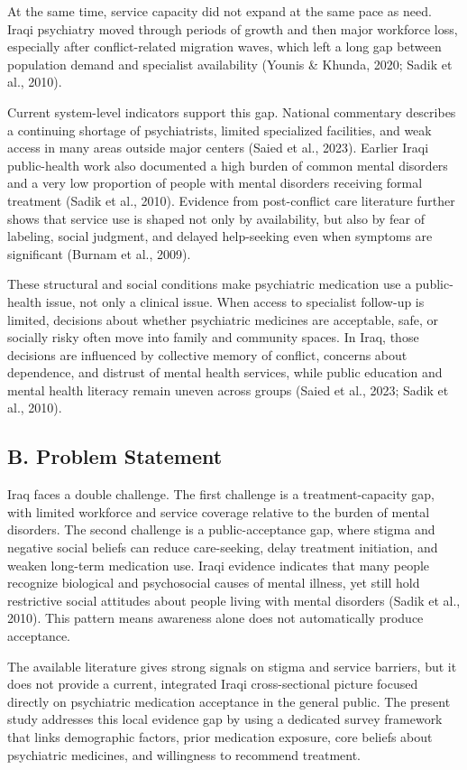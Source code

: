 \documentclass[12pt,a4paper]{article}
\begin{document}
At the same time, service capacity did not expand at the same pace as need. Iraqi psychiatry moved through periods of growth and then major workforce loss, especially after conflict-related migration waves, which left a long gap between population demand and specialist availability (Younis \& Khunda, 2020; Sadik et al., 2010).

Current system-level indicators support this gap. National commentary describes a continuing shortage of psychiatrists, limited specialized facilities, and weak access in many areas outside major centers (Saied et al., 2023). Earlier Iraqi public-health work also documented a high burden of common mental disorders and a very low proportion of people with mental disorders receiving formal treatment (Sadik et al., 2010). Evidence from post-conflict care literature further shows that service use is shaped not only by availability, but also by fear of labeling, social judgment, and delayed help-seeking even when symptoms are significant (Burnam et al., 2009).

These structural and social conditions make psychiatric medication use a public-health issue, not only a clinical issue. When access to specialist follow-up is limited, decisions about whether psychiatric medicines are acceptable, safe, or socially risky often move into family and community spaces. In Iraq, those decisions are influenced by collective memory of conflict, concerns about dependence, and distrust of mental health services, while public education and mental health literacy remain uneven across groups (Saied et al., 2023; Sadik et al., 2010).

\subsection*{B. Problem Statement}
Iraq faces a double challenge. The first challenge is a treatment-capacity gap, with limited workforce and service coverage relative to the burden of mental disorders. The second challenge is a public-acceptance gap, where stigma and negative social beliefs can reduce care-seeking, delay treatment initiation, and weaken long-term medication use. Iraqi evidence indicates that many people recognize biological and psychosocial causes of mental illness, yet still hold restrictive social attitudes about people living with mental disorders (Sadik et al., 2010). This pattern means awareness alone does not automatically produce acceptance.

The available literature gives strong signals on stigma and service barriers, but it does not provide a current, integrated Iraqi cross-sectional picture focused directly on psychiatric medication acceptance in the general public. The present study addresses this local evidence gap by using a dedicated survey framework that links demographic factors, prior medication exposure, core beliefs about psychiatric medicines, and willingness to recommend treatment.
\end{document}
